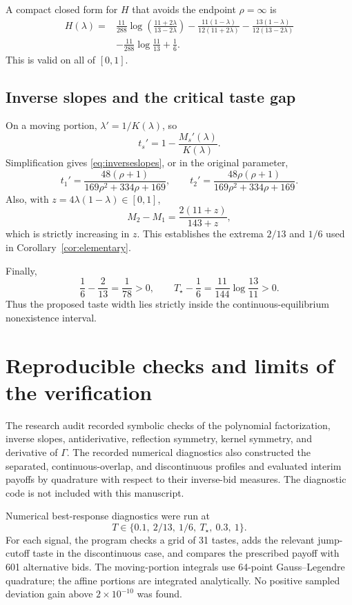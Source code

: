 \documentclass[11pt,a4paper]{article}
\numberwithin{equation}{section}
\theoremstyle{definition}
\theoremstyle{remark}
\newcommand{\Ts}{T_\star}
\begin{document}
A compact closed form for $H$ that avoids the endpoint $\rho=\infty$ is
\begin{align}
 H(\lambda)={}&\frac{11}{288}
 \log\!\left(\frac{11+2\lambda}{13-2\lambda}\right)
 -\frac{11(1-\lambda)}{12(11+2\lambda)}
 -\frac{13(1-\lambda)}{12(13-2\lambda)}\nonumber\\
 &-\frac{11}{288}\log\!\frac{11}{13}+\frac16.
 \label{eq:Hclosed}
\end{align}
This is valid on all of $[0,1]$.

\subsection{Inverse slopes and the critical taste gap}
On a moving portion, $\lambda'=1/K(\lambda)$, so
\[
 t_s'=1-\frac{M_s'(\lambda)}{K(\lambda)}.
\]
Simplification gives \eqref{eq:inverseslopes}, or in the original parameter,
\[
 t_1'=\frac{48(\rho+1)}{169\rho^2+334\rho+169},\qquad
 t_2'=\frac{48\rho(\rho+1)}{169\rho^2+334\rho+169}.
\]
Also, with $z=4\lambda(1-\lambda)\in[0,1]$,
\[
 M_2-M_1=\frac{2(11+z)}{143+z},
\]
which is strictly increasing in $z$. This establishes the extrema $2/13$ and $1/6$ used in Corollary~\ref{cor:elementary}.

Finally,
\[
 \frac16-\frac2{13}=\frac1{78}>0,\qquad
 \Ts-\frac16=\frac{11}{144}\log\!\frac{13}{11}>0.
\]
Thus the proposed taste width lies strictly inside the continuous-equilibrium nonexistence interval.

\section{Reproducible checks and limits of the verification}
\label{app:checks}

The research audit recorded symbolic checks of the polynomial factorization, inverse slopes, antiderivative, reflection symmetry, kernel symmetry, and derivative of $\Gamma$. The recorded numerical diagnostics also constructed the separated, continuous-overlap, and discontinuous profiles and evaluated interim payoffs by quadrature with respect to their inverse-bid measures. The diagnostic code is not included with this manuscript.

Numerical best-response diagnostics were run at
\[
 T\in\{0.1,\ 2/13,\ 1/6,\ \Ts,\ 0.3,\ 1\}.
\]
For each signal, the program checks a grid of 31 tastes, adds the relevant jump-cutoff taste in the discontinuous case, and compares the prescribed payoff with 601 alternative bids. The moving-portion integrals use 64-point Gauss--Legendre quadrature; the affine portions are integrated analytically. No positive sampled deviation gain above $2\times10^{-10}$ was found.
\end{document}
